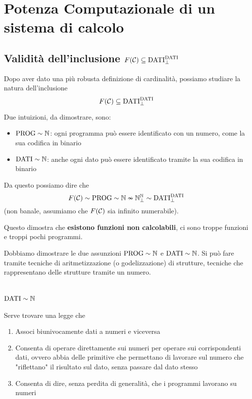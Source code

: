 \section{Potenza Computazionale di un sistema di calcolo}

\subsection{Validità dell'inclusione $F(\mathcal{C}) \subseteq \text{DATI}_\bot^{\text{DATI}}$}

Dopo aver dato una più robusta definizione di cardinalità, possiamo studiare la natura dell'inclusione
$$ F(\mathcal{C}) \subseteq \text{DATI}_\bot^{\text{DATI}} $$

Due intuizioni, da dimostrare, sono: 
\begin{itemize}
	\item $\text{PROG} \sim \mathbb{N}$: ogni programma può essere identificato con un numero, come la sua codifica in binario
	
    \item $\text{DATI} \sim \mathbb{N}$: anche ogni dato può essere identificato tramite la sua codifica in binario
\end{itemize}

Da questo possiamo dire che
$$ F(\mathcal{C}) \sim \text{PROG} \sim \mathbb{N} \nsim \mathbb{N}_\bot^{\mathbb{N}} \sim \text{DATI}_\bot^{\text{DATI}} $$
(non banale, assumiamo che $F(\mathcal{C})$ sia infinito numerabile).

Questo dimostra che \textbf{esistono funzioni non calcolabili}, ci sono troppe funzioni e troppi pochi programmi. 

Dobbiamo dimostrare le due assunzioni $\text{PROG} \sim \mathbb{N}$ e $\text{DATI} \sim \mathbb{N}$. Si può fare tramite tecniche di aritmetizzazione (o godelizzazione) di strutture, tecniche che rappresentano delle strutture tramite un numero.

\section{$\text{DATI} \sim \mathbb{N}$}

Serve trovare una legge che
\begin{enumerate}
	\item Associ biunivocamente dati a numeri e viceversa
	
    \item Consenta di operare direttamente sui numeri per operare sui corrispondenti dati, ovvero abbia delle primitive che permettano di lavorare sul numero che "riflettano" il risultato sul dato, senza passare dal dato stesso
	
    \item Consenta di dire, senza perdita di generalità, che i programmi lavorano su numeri
\end{enumerate}

